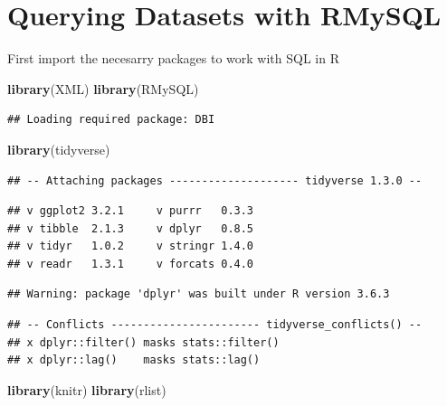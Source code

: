 \documentclass[
]{book}
\newenvironment{Shaded}{\begin{snugshade}}{\end{snugshade}}
\newcommand{\KeywordTok}[1]{\textcolor[rgb]{0.13,0.29,0.53}{\textbf{#1}}}
\newcommand{\NormalTok}[1]{#1}
\begin{document}
\hypertarget{querying-datasets-with-rmysql}{%
\section{Querying Datasets with RMySQL}\label{querying-datasets-with-rmysql}}

First import the necesarry packages to work with SQL in R

\begin{Shaded}
\begin{Highlighting}[]
\KeywordTok{library}\NormalTok{(XML)}
\KeywordTok{library}\NormalTok{(RMySQL)}
\end{Highlighting}
\end{Shaded}

\begin{verbatim}
## Loading required package: DBI
\end{verbatim}

\begin{Shaded}
\begin{Highlighting}[]
\KeywordTok{library}\NormalTok{(tidyverse)}
\end{Highlighting}
\end{Shaded}

\begin{verbatim}
## -- Attaching packages -------------------- tidyverse 1.3.0 --
\end{verbatim}

\begin{verbatim}
## v ggplot2 3.2.1     v purrr   0.3.3
## v tibble  2.1.3     v dplyr   0.8.5
## v tidyr   1.0.2     v stringr 1.4.0
## v readr   1.3.1     v forcats 0.4.0
\end{verbatim}

\begin{verbatim}
## Warning: package 'dplyr' was built under R version 3.6.3
\end{verbatim}

\begin{verbatim}
## -- Conflicts ----------------------- tidyverse_conflicts() --
## x dplyr::filter() masks stats::filter()
## x dplyr::lag()    masks stats::lag()
\end{verbatim}

\begin{Shaded}
\begin{Highlighting}[]
\KeywordTok{library}\NormalTok{(knitr)}
\KeywordTok{library}\NormalTok{(rlist)}
\end{Highlighting}
\end{Shaded}
\end{document}
